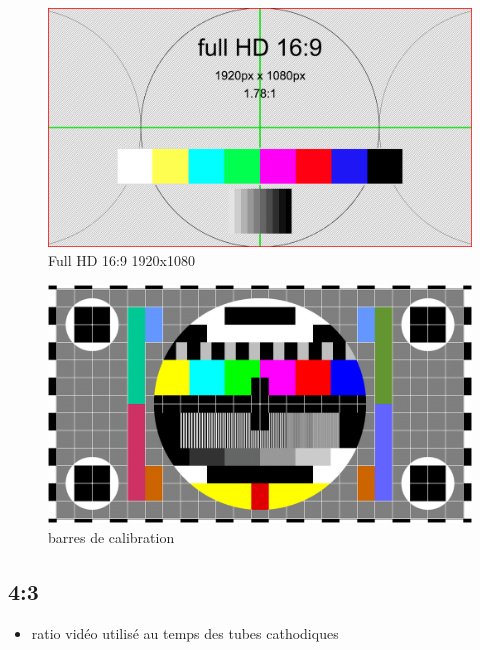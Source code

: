 \documentclass[
  french,
]{book}
\providecommand{\tightlist}{%
  \setlength{\itemsep}{0pt}\setlength{\parskip}{0pt}}
\begin{document}
\begin{figure}
\centering
\includegraphics{medias/lexique/fullHD_16_9_1920x1080.png}
\caption{Full HD 16:9 1920x1080}
\end{figure}

\begin{figure}
\centering
\includegraphics{medias/lexique/barre_couleurs-1600x900.png}
\caption{barres de calibration}
\end{figure}

\hypertarget{section-2}{%
\subsection{4:3}\label{section-2}}

\begin{itemize}
\tightlist
\item
  ratio vidéo utilisé au temps des tubes cathodiques
\end{itemize}
\end{document}
